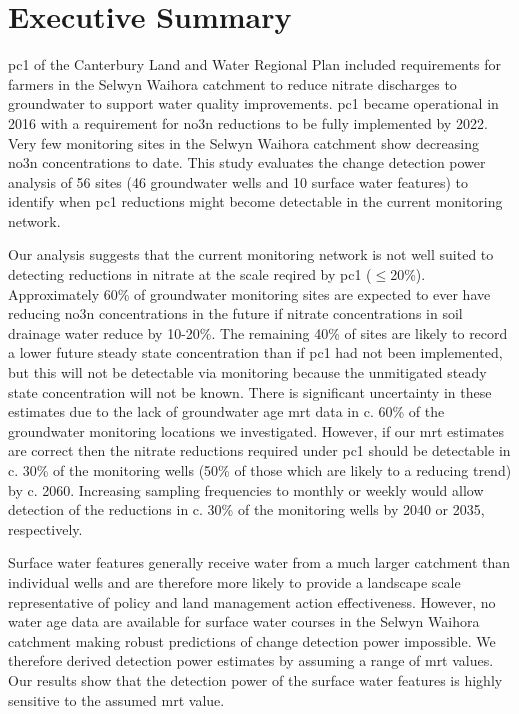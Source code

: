 
\section*{Executive Summary} \label{exsum} %

\gls{pc1} of the Canterbury Land and Water Regional Plan included requirements for farmers in the Selwyn Waihora catchment to reduce nitrate discharges to groundwater to support water quality improvements.
\gls{pc1} became operational in 2016 with a requirement for \gls{no3n} reductions to be fully implemented by 2022.
Very few monitoring sites in the Selwyn Waihora catchment show decreasing \gls{no3n} concentrations to date.
This study evaluates the change detection power analysis of 56 sites (46 groundwater wells and 10 surface water features) to identify when \gls{pc1} reductions might become detectable in the current monitoring network.

Our analysis suggests that the current monitoring network is not well suited to detecting reductions in nitrate at the scale reqired by \gls{pc1} ($\leq$20\%).
Approximately 60\% of groundwater monitoring sites are expected to ever have reducing \gls{no3n} concentrations in the future if nitrate concentrations in soil drainage water reduce by 10-20\%.
The remaining 40\% of sites are likely to record a lower future steady state concentration than if \gls{pc1} had not been implemented, but this will not be detectable via monitoring because the unmitigated steady state concentration will not be known.
There is significant uncertainty in these estimates due to the lack of groundwater age \gls{mrt} data in c. 60\% of the groundwater monitoring locations we investigated.
However, if our \gls{mrt} estimates are correct then the nitrate reductions required under \gls{pc1} should be detectable in c. 30\% of the monitoring wells (50\% of those which are likely to a reducing trend) by c. 2060.
Increasing sampling frequencies to monthly or weekly would allow detection of the reductions in c. 30\% of the monitoring wells by 2040 or 2035, respectively.

Surface water features generally receive water from a much larger catchment than individual wells and are therefore more likely to provide a landscape scale representative of policy and land management action effectiveness. However, no water age data are available for surface water courses in the Selwyn Waihora catchment making robust predictions of change detection power impossible.
We therefore derived detection power estimates by assuming a range of \gls{mrt} values.
Our results show that the detection power of the surface water features is highly sensitive to the assumed \gls{mrt} value.

